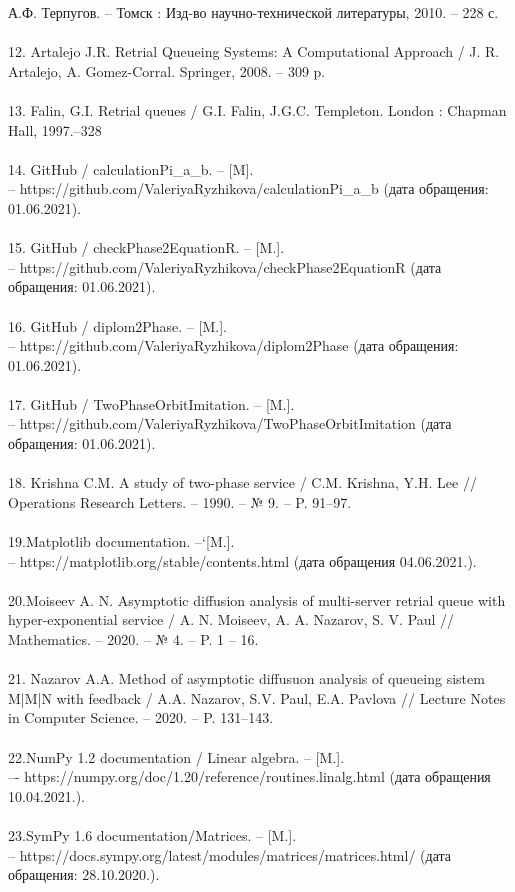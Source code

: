 А.Ф. Терпугов. -- Томск : Изд-во научно-технической литературы, 2010. --
228 с. \\
\\
12. Artalejo J.R. Retrial Queueing Systems: A Computational Approach / J. R. Artalejo, A. Gomez-Corral.
Springer, 2008. -- 309 p.\\
\\
13. Falin, G.I. Retrial queues / G.I. Falin, J.G.C. Templeton. London : Chapman Hall, 1997.–328 \\
\\
14. GitHub / calculationPi\_a\_b. -- [M].\\ -- https://github.com/ValeriyaRyzhikova/calculationPi\_a\_b (дата обращения: 01.06.2021).\\
\\
15. GitHub / checkPhase2EquationR. -- [M.].\\ --  https://github.com/ValeriyaRyzhikova/checkPhase2EquationR (дата обращения: 01.06.2021).\\
\\
16. GitHub / diplom2Phase. -- [M.].\\ -- https://github.com/ValeriyaRyzhikova/diplom2Phase (дата обращения: 01.06.2021).\\
\\
17. GitHub / TwoPhaseOrbitImitation. -- [M.].\\ -- https://github.com/ValeriyaRyzhikova/TwoPhaseOrbitImitation (дата обращения: 01.06.2021).\\
\\
18. Krishna C.M. A study of two-phase service / C.M. Krishna, Y.H. Lee  //
Operations Research Letters. -- 1990. -- № 9. -- P. 91–97.\\
\\
19.Matplotlib documentation. --`[M.].\\ -- https://matplotlib.org/stable/contents.html  (дата обращения 04.06.2021.).\\
\\
20.Moiseev A. N. Asymptotic diffusion analysis of multi-server retrial queue with hyper-exponential service / A. N. Moiseev, A. A. Nazarov, S. V. Paul // Mathematics. -- 2020. -- № 4. -- P. 1 -- 16.\\
\\
21. Nazarov A.A. Method of asymptotic diffusuon analysis of queueing sistem M|M|N with feedback / A.A. Nazarov, S.V. Paul, E.A. Pavlova // Lecture Notes in Computer Science. -- 2020. -- P. 131--143.\\
\\
22.NumPy 1.2 documentation / Linear algebra. -- [M.].\\ –- https://numpy.org/doc/1.20/reference/routines.linalg.html  (дата обращения 10.04.2021.).\\
\\
23.SymPy 1.6 documentation/Matrices. -- [M.].\\ -- https://docs.sympy.org/latest/modules/matrices/matrices.html/  (дата обращения: 28.10.2020.).\\
\\